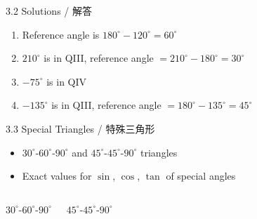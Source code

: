 \documentclass[aspectratio=169]{beamer}
\begin{document}
\begin{frame}{3.2 Solutions / 解答}
    \begin{tcolorbox}[colback=lightgray,colframe=accent,title=Solutions]
        \footnotesize
        \begin{enumerate}
            \item Reference angle is $180^\circ - 120^\circ = 60^\circ$
            \item $210^\circ$ is in QIII, reference angle $= 210^\circ - 180^\circ = 30^\circ$
            \item $-75^\circ$ is in QIV
            \item $-135^\circ$ is in QIII, reference angle $= 180^\circ - 135^\circ = 45^\circ$
        \end{enumerate}
    \end{tcolorbox}
\end{frame}

\begin{frame}{3.3 Special Triangles / 特殊三角形}
    \begin{tcolorbox}[colback=lightgray,colframe=primary,title=Key Points]
        \footnotesize
        \begin{itemize}
            \item $30^\circ$-$60^\circ$-$90^\circ$ and $45^\circ$-$45^\circ$-$90^\circ$ triangles
            \item Exact values for $\sin$, $\cos$, $\tan$ of special angles
        \end{itemize}
    \end{tcolorbox}
    \vspace{0.5em}
    \begin{columns}
        \centering
        $30^\circ$-$60^\circ$-$90^\circ$
        \centering
        $45^\circ$-$45^\circ$-$90^\circ$
    \end{columns}
\end{frame}
\end{document}
